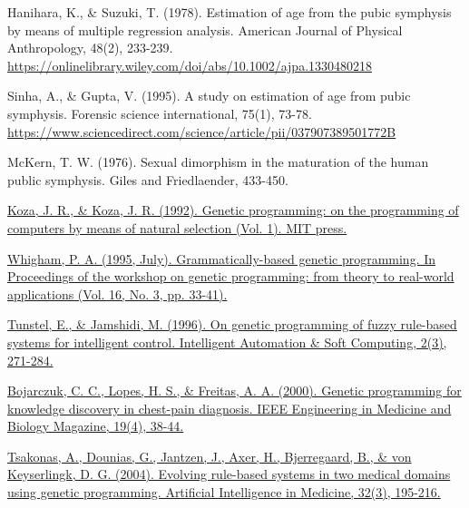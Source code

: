 \begin{thebibliography}{9}

	Hanihara, K., \& Suzuki, T. (1978). Estimation of age from the pubic symphysis by means of multiple regression analysis. American Journal of Physical Anthropology, 48(2), 233-239. \url{https://onlinelibrary.wiley.com/doi/abs/10.1002/ajpa.1330480218}


	Sinha, A., \& Gupta, V. (1995). A study on estimation of age from pubic symphysis. Forensic science international, 75(1), 73-78. \url{https://www.sciencedirect.com/science/article/pii/037907389501772B}


	McKern, T. W. (1976). Sexual dimorphism in the maturation of the human public symphysis. Giles and Friedlaender, 433-450.



	\href{https://mitpress.mit.edu/books/genetic-programming}{Koza, J. R., \& Koza, J. R. (1992). Genetic programming: on the programming of computers by means of natural selection (Vol. 1). MIT press.}


	\href{https://www.researchgate.net/profile/Pa-Whigham/publication/2450222_Grammatically-based_Genetic_Programming/links/55c3c89908aebc967df1b765/Grammatically-based-Genetic-Programming.pdf}{Whigham, P. A. (1995, July). Grammatically-based genetic programming. In Proceedings of the workshop on genetic programming: from theory to real-world applications (Vol. 16, No. 3, pp. 33-41).}


	\href{https://www.tandfonline.com/doi/abs/10.1080/10798587.1996.10750674}{Tunstel, E., \& Jamshidi, M. (1996). On genetic programming of fuzzy rule-based systems for intelligent control. Intelligent Automation \& Soft Computing, 2(3), 271-284.}


	\href{https://ieeexplore.ieee.org/document/853480}{Bojarczuk, C. C., Lopes, H. S., \& Freitas, A. A. (2000). Genetic programming for knowledge discovery in chest-pain diagnosis. IEEE Engineering in Medicine and Biology Magazine, 19(4), 38-44.}


	\href{https://www.sciencedirect.com/science/article/pii/S0933365704001058}{Tsakonas, A., Dounias, G., Jantzen, J., Axer, H., Bjerregaard, B., \& von Keyserlingk, D. G. (2004). Evolving rule-based systems in two medical domains using genetic programming. Artificial Intelligence in Medicine, 32(3), 195-216.}


\end{thebibliography}
